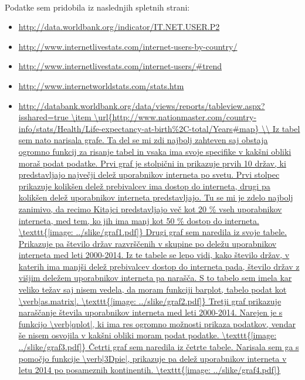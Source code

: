 \documentclass[11pt,a4paper]{article}
\begin{document}
\\ Podatke sem pridobila iz naslednjih spletnih strani:
\begin{itemize} 
\item \url{http://data.worldbank.org/indicator/IT.NET.USER.P2}
\item \url{http://www.internetlivestats.com/internet-users-by-country/}
\item \url{http://www.internetlivestats.com/internet-users/#trend}
\item \url{http://www.internetworldstats.com/stats.htm}
\item \url{http://databank.worldbank.org/data/views/reports/tableview.aspx?isshared=true
\item \url{http://www.nationmaster.com/country-info/stats/Health/Life-expectancy-at-birth%2C-total/Years#map}


\\ Iz tabel sem nato narisala grafe. Ta del se mi zdi najbolj zahteven saj obstaja ogromno funkcij za risanje tabel in vsaka ima svoje specifike v kakšni obliki moraš podat podatke.

Prvi graf je stolpični in prikazuje prvih 10 držav, ki predstavljajo največji delež uporabnikov interneta po svetu. Prvi stolpec prikazuje kolikšen delež prebivalcev ima dostop do interneta, drugi pa kolikšen delež uporabnikov interneta predstavljajo. Tu se mi je zdelo najbolj zanimivo, da recimo Kitajci predstavljajo več kot 20 \% vseh uporabnikov interneta, med tem, ko jih ima manj kot 50 \% dostop do interneta.
\texttt{[image: ../slike/graf1.pdf]}

Drugi graf sem naredila iz svoje tabele. Prikazuje pa število držav razvrščenih v skupine po deležu uporabnikov interneta med leti 2000-2014. Iz te tabele se lepo vidi, kako število držav, v katerih ima manjši delež prebivalcev dostop do interneta pada, število držav z višjim deležem uporabnikov interneta pa narašča.
S to tabelo sem imela kar veliko težav saj nisem vedela, da moram funkciji barplot, tabelo podat kot \verb|as.matrix|.
\texttt{[image: ../slike/graf2.pdf]}

Tretji graf prikazuje naraščanje števila uporabnikov interneta med leti 2000-2014. Narejen je s funkcijo \verb|qplot|, ki ima res ogromno možnosti prikaza podatkov, vendar še nisem osvojila v kakšni obliki moram podat podatke. 
\texttt{[image: ../slike/graf3.pdf]}

Četrti graf sem naredila iz četrte tabele. Narisala sem ga s pomočjo funkcije \verb|3Dpie|, prikazuje pa delež uporabnikov interneta v letu 2014 po posameznih kontinentih.
\texttt{[image: ../slike/graf4.pdf]}

}
\end{itemize}
\end{document}
